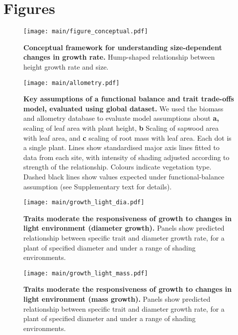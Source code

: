 \documentclass[a4paper,11pt]{article}
\begin{document}
\newpage

\section{Figures}\label{figures}


\newpage

\begin{figure}[ht]
\centering
\texttt{[image: main/figure\_conceptual.pdf]}
\caption{\textbf{Conceptual framework for understanding size-dependent
changes in growth rate.} Hump-shaped relationship between height growth rate and
size. \label{f-conceptual}}
\end{figure}

\newpage

\begin{figure}[ht]
\centering
\texttt{[image: main/allometry.pdf]}
\caption{\textbf{Key assumptions of a functional balance and trait
trade-offs model, evaluated using global dataset.} We used the biomass and
allometry database to evaluate model assumptions about \textbf{a,}
scaling of leaf area with plant height, \textbf{b} Scaling of sapwood
area with leaf area, and \textbf{c} scaling of root mass with leaf area.
Each dot is a single plant. Lines show standardised major axis lines
fitted to data from each site, with intensity of shading adjusted
according to strength of the relationship. Colours indicate vegetation
type. Dashed black lines show values expected under functional-balance
assumption (see Supplementary text for details). \label{f-assumptions}}
\end{figure}

\newpage

\begin{figure}[ht]
\centering
\texttt{[image: main/growth\_light\_dia.pdf]}
\caption{\textbf{Traits moderate the responsiveness of growth to changes
in light environment (diameter growth).} Panels show predicted relationship between
specific trait and diameter growth rate, for a plant of specified
diameter and under a range of shading environments.
\label{f-growth_light_dia}}
\end{figure}

\begin{figure}[ht]
\centering
\texttt{[image: main/growth\_light\_mass.pdf]}
\caption{\textbf{Traits moderate the responsiveness of growth to changes
in light environment (mass growth).} Panels show predicted relationship between
specific trait and diameter growth rate, for a plant of specified
diameter and under a range of shading environments.
\label{f-growth_light_mass}}
\end{figure}
\end{document}
